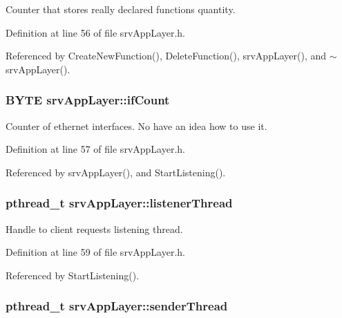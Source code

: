 Counter that stores really declared functions quantity. 



Definition at line 56 of file srvAppLayer.h.



Referenced by CreateNewFunction(), DeleteFunction(), srvAppLayer(), and $\sim$srvAppLayer().

\hypertarget{classsrvAppLayer_a24850f0f199b20e7b5a146a034bfbb69}{
\subsubsection[{ifCount}]{\setlength{\rightskip}{0pt plus 5cm}BYTE {\bf srvAppLayer::ifCount}}}
\label{d8/d72/classsrvAppLayer_a24850f0f199b20e7b5a146a034bfbb69}


Counter of ethernet interfaces. No have an idea how to use it. 



Definition at line 57 of file srvAppLayer.h.



Referenced by srvAppLayer(), and StartListening().

\hypertarget{classsrvAppLayer_ae836e655cb632038b45ed12c0c646994}{
\subsubsection[{listenerThread}]{\setlength{\rightskip}{0pt plus 5cm}pthread\_\-t {\bf srvAppLayer::listenerThread}}}
\label{d8/d72/classsrvAppLayer_ae836e655cb632038b45ed12c0c646994}


Handle to client requests listening thread. 



Definition at line 59 of file srvAppLayer.h.



Referenced by StartListening().

\hypertarget{classsrvAppLayer_a76a101733f9ede55cd32bff4890bd45c}{
\subsubsection[{senderThread}]{\setlength{\rightskip}{0pt plus 5cm}pthread\_\-t {\bf srvAppLayer::senderThread}}}
\label{d8/d72/classsrvAppLayer_a76a101733f9ede55cd32bff4890bd45c}


